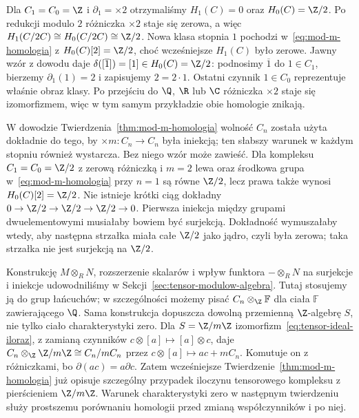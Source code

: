 \begin{przyklad}
Dla $C_1=C_0=\Z$ i $\partial_1=\times2$
otrzymaliśmy $H_1(C)=0$ oraz
$H_0(C)=\Z/2$. Po redukcji modulo
$2$ różniczka $\times2$ staje się
zerowa, a więc
$H_1(C/2C)\cong H_0(C/2C)\cong\Z/2$.
Nowa klasa stopnia $1$ pochodzi
w~\eqref{eq:mod-m-homologia} z
$H_0(C)[2]=\Z/2$, choć wcześniejsze
$H_1(C)$ było zerowe.
Jawny wzór z dowodu daje
$\delta([\overline1])=[1]\in H_0(C)=\Z/2$:
podnosimy $\overline1$ do $1\in C_1$,
bierzemy $\partial_1(1)=2$ i zapisujemy $2=2\cdot1$.
Ostatni czynnik $1\in C_0$ reprezentuje właśnie obraz klasy.
Po przejściu do $\Q$, $\R$ lub $\C$
różniczka $\times2$ staje się izomorfizmem,
więc w tym samym przykładzie obie homologie znikają.
\end{przyklad}

\begin{uwaga}
W dowodzie Twierdzenia~\ref{thm:mod-m-homologia}
wolność $C_n$ została użyta dokładnie do tego,
by $\times m:C_n\to C_n$ była iniekcją;
ten słabszy warunek w każdym stopniu również wystarcza.
Bez niego wzór może zawieść. Dla kompleksu
$C_1=C_0=\Z/2$ z zerową różniczką i $m=2$
lewa oraz środkowa grupa w~\eqref{eq:mod-m-homologia}
przy $n=1$ są równe $\Z/2$, lecz prawa także wynosi
$H_0(C)[2]=\Z/2$. Nie istnieje krótki ciąg dokładny
$0\to\Z/2\to\Z/2\to\Z/2\to0$.
Pierwsza iniekcja między grupami dwuelementowymi musiałaby
bowiem być surjekcją. Dokładność wymuszałaby wtedy,
aby następna strzałka miała całe $\Z/2$ jako jądro,
czyli była zerowa; taka strzałka nie jest surjekcją na $\Z/2$.
\end{uwaga}

\begin{uwaga}
\label{uwaga:tensor-modulow}
Konstrukcję $M\otimes_R N$, rozszerzenie skalarów
i wpływ funktora $-\otimes_R N$ na surjekcje i iniekcje
udowodniliśmy w Sekcji~\ref{sec:tensor-modulow-algebra}.
Tutaj stosujemy ją do grup łańcuchów; w szczególności
możemy pisać $C_n\otimes_{\Z}\mathbb F$ dla ciała
$\mathbb F$ zawierającego $\Q$.
Sama konstrukcja dopuszcza dowolną przemienną $\Z$-algebrę $S$,
nie tylko ciało charakterystyki zero. Dla $S=\Z/m\Z$
izomorfizm~\eqref{eq:tensor-ideal-iloraz}, z zamianą czynników
$c\otimes[a]\mapsto[a]\otimes c$, daje
$C_n\otimes_{\Z}\Z/m\Z\cong C_n/mC_n$ przez
$c\otimes[a]\mapsto ac+mC_n$.
Komutuje on z różniczkami, bo $\partial(ac)=a\partial c$.
Zatem wcześniejsze Twierdzenie~\ref{thm:mod-m-homologia}
już opisuje szczególny przypadek iloczynu tensorowego kompleksu
z pierścieniem $\Z/m\Z$.
Warunek charakterystyki zero w następnym twierdzeniu służy
prostszemu porównaniu homologii przed zmianą współczynników i po niej.
\end{uwaga}

